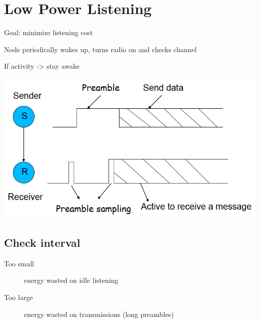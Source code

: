 \section{Low Power Listening}

Goal: minimize listening cost

Node periodically wakes up, turns radio on and checks channel

If activity -> stay awake

\begin{center}
 \includegraphics[scale=0.5]{img/LPL-PreambleSampling.png}
\end{center}

\subsection{Check interval}
\begin{description}
	\item[Too small] energy wasted on idle listening
	\item[Too large] energy wasted on transmissions (long preambles)
\end{description}

